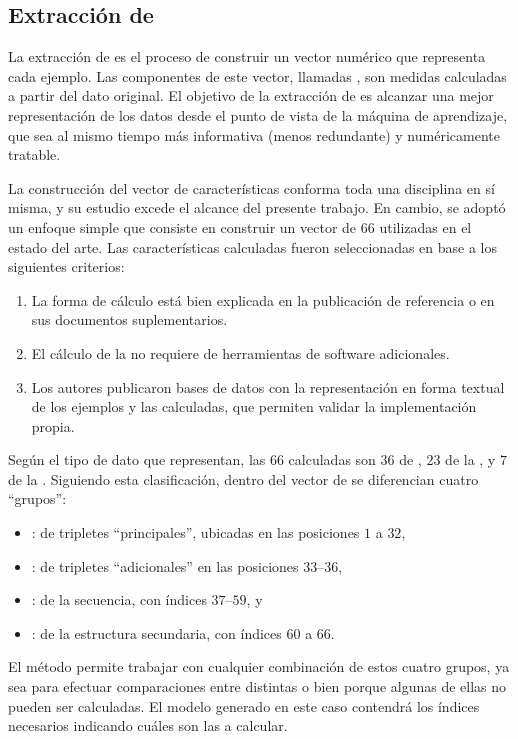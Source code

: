 %
%
\subsection{Extracción de }
%
La extracción de  es el proceso de construir un vector
numérico que representa cada ejemplo.
Las componentes de este vector, llamadas , son
medidas calculadas a partir del dato original.
El objetivo de la extracción de  es alcanzar una mejor
representación de los datos desde el punto de vista de la máquina de
aprendizaje, que sea al mismo tiempo más informativa (menos
redundante) y numéricamente tratable.

La construcción del vector de características conforma toda una
disciplina en sí misma, y su estudio excede el alcance del presente
trabajo.
En cambio, se adoptó un enfoque simple que consiste en construir un
vector de $66$  utilizadas en el estado del arte.
Las características calculadas fueron seleccionadas en base a los
siguientes criterios:
%
\begin{enumerate}
\item
  La forma de cálculo está bien explicada en la publicación de
  referencia o en sus documentos suplementarios.
\item
  El cálculo de la \caract{} no requiere de herramientas de software
  adicionales.
\item
  Los autores publicaron bases de datos con la representación en forma
  textual de los ejemplos y las  calculadas, que permiten
  validar la implementación propia.
\end{enumerate}
%
Según el tipo de dato que representan, las $66$  calculadas
son $36$  de , $23$  de la
, y $7$ de la .
Siguiendo esta clasificación, dentro del vector de  se
diferencian cuatro ``grupos'':
%
%
\begin{itemize}
\item {}:  de tripletes ``principales'', ubicadas
  en las posiciones $1$ a $32$,
\item {}:  de tripletes ``adicionales'' en las
  posiciones $33$--$36$,
\item {}:  de la secuencia, con índices $37$--$59$, y
\item {}:  de la estructura secundaria, con
  índices $60$ a $66$.
\end{itemize}
%
El método permite trabajar con cualquier combinación de estos cuatro
grupos, ya sea para efectuar comparaciones entre distintas 
o bien porque algunas de ellas no pueden ser calculadas.
El modelo generado en este caso contendrá los índices necesarios
indicando cuáles son las  a calcular.


